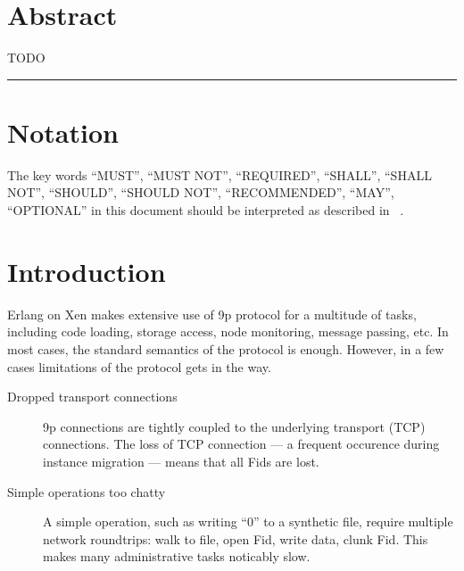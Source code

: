 
\def\mytitle{9P2000 Protocol Erlang Extention    \\
v0.1}
\def\myauthor{Maxim Kharchenko}
\def\mydate{December 17, 2012}
\def\mycopyright{2012, Cloudozer LLP. All Rights Reserved.}
\def\latexmode{memoir}

\chapter{Abstract}
\label{abstract}

TODO

\begin{center}\rule{3in}{0.4pt}\end{center}


\chapter{Notation}
\label{notation}

The key words ``MUST'', ``MUST NOT'', ``REQUIRED'', ``SHALL'', ``SHALL NOT'', ``SHOULD'',
``SHOULD NOT'', ``RECOMMENDED'', ``MAY'', ``OPTIONAL'' in this document should be
interpreted as described in ~\citep{RFC2119}.

\chapter{Introduction}
\label{introduction}

Erlang on Xen makes extensive use of 9p protocol for a multitude of tasks,
including code loading, storage access, node monitoring, message passing, etc.
In most cases, the standard semantics of the protocol is enough. However, in a
few cases limitations of the protocol gets in the way.\begin{description}

\item[Dropped transport connections]

9p connections are tightly coupled to the underlying transport (TCP)
 connections. The loss of TCP connection --- a frequent occurence during
 instance migration --- means that all Fids are lost.

\item[Simple operations too chatty]

A simple operation, such as writing ``0'' to a synthetic file, require
 multiple network roundtrips: walk to file, open Fid, write data, clunk Fid.
 This makes many administrative tasks noticably slow.
\end{description}

